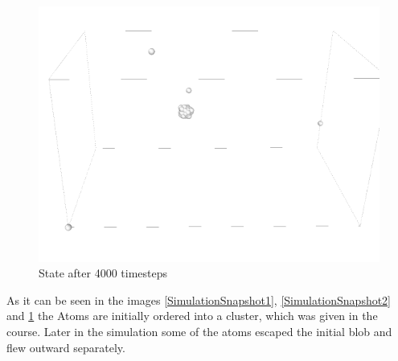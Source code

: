 \begin{figure}
	\begin{center}
		\includegraphics[scale= 0.65]{Figure/3ImageS.png}
	\end{center}
	\caption[Simulation Snapshot 3]{State after 4000 timesteps}
	\label{SimulationSnapshot3}
\end{figure}
As it can be seen in the images \ref{SimulationSnapshot1}, \ref{SimulationSnapshot2} and \ref{SimulationSnapshot3} the Atoms are initially ordered into a cluster, which was given in the course. 
Later in the simulation some of the atoms escaped the initial blob and flew outward separately. 
